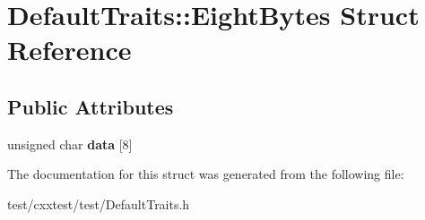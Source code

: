 \hypertarget{structDefaultTraits_1_1EightBytes}{\section{Default\-Traits\-:\-:Eight\-Bytes Struct Reference}
\label{structDefaultTraits_1_1EightBytes}
}
\subsection*{Public Attributes}
\begin{DoxyCompactItemize}
\item 
\hypertarget{structDefaultTraits_1_1EightBytes_a5abb3681c7116c3854e750564a984d4c}{unsigned char {\bfseries data} \mbox{[}8\mbox{]}}\label{structDefaultTraits_1_1EightBytes_a5abb3681c7116c3854e750564a984d4c}

\end{DoxyCompactItemize}


The documentation for this struct was generated from the following file\-:\begin{DoxyCompactItemize}
\item 
test/cxxtest/test/Default\-Traits.\-h\end{DoxyCompactItemize}
